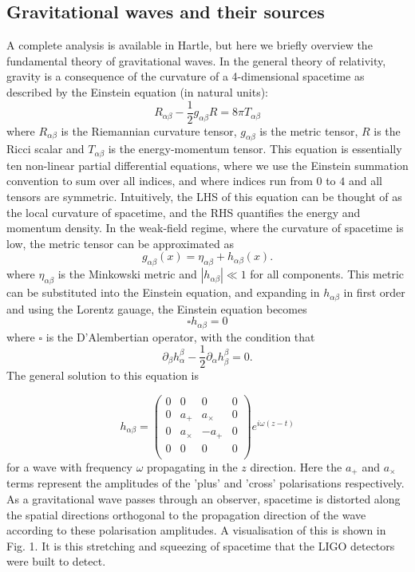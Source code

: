 \documentclass[11pt]{article}
\begin{document}
\subsection{Gravitational waves and their sources}
A complete analysis is available in Hartle\cite{hartle}, but here we briefly overview the fundamental theory of gravitational waves. In the general theory of relativity, gravity is a consequence of the curvature of a 4-dimensional spacetime as described by the Einstein equation (in natural units):
\begin{equation}
R_{\alpha\beta}-\frac{1}{2}g_{\alpha\beta}R=8\pi T_{\alpha\beta}
\end{equation}
where $R_{\alpha\beta}$ is the Riemannian curvature tensor, $g_{\alpha\beta}$ is the metric tensor, $R$ is the Ricci scalar and $T_{\alpha\beta}$ is the energy-momentum tensor. This equation is essentially ten non-linear partial differential equations, where we use the Einstein summation convention to sum over all indices, and where indices run from $0$ to $4$ and all tensors are symmetric. Intuitively, the LHS of this equation can be thought of as the local curvature of spacetime, and the RHS quantifies the energy and momentum density. In the weak-field regime, where the curvature of spacetime is low, the metric tensor can be approximated as
\begin{equation}
g_{\alpha\beta}(x)=\eta_{\alpha\beta}+h_{\alpha\beta}(x).
\end{equation}
where $\eta_{\alpha\beta}$ is the Minkowski metric and $|h_{\alpha\beta}| \ll 1$ for all components. This metric can be substituted into the Einstein equation, and expanding in $h_{\alpha\beta}$ in first order and using the Lorentz gauage, the Einstein equation becomes
\begin{equation}
\square h_{\alpha\beta}=0
\end{equation}
where $\square$ is the D'Alembertian operator, with the condition that
\begin{equation}
\partial_\beta h^\beta_\alpha-\frac{1}{2}\partial_\alpha h^\beta_\beta=0.
\end{equation}
The general solution to this equation is

\begin{equation}
h_{\alpha\beta}=
\begin{pmatrix}
0 & 0 & 0 & 0\\
0 & a_+ & a_\times & 0\\
0 & a_\times & -a_+ & 0\\
0 & 0 & 0 & 0\\
\end{pmatrix}
e^{i\omega(z-t)}
\end{equation}
for a wave with frequency $\omega$ propagating in the $z$ direction. Here the $a_+$ and $a_\times$ terms represent the amplitudes of the 'plus' and 'cross' polarisations respectively. As a gravitational wave passes through an observer, spacetime is distorted along the spatial directions orthogonal to the propagation direction of the wave according to these polarisation amplitudes. A visualisation of this is shown in Fig. 1. It is this stretching and squeezing of spacetime that the LIGO detectors were built to detect.
\end{document}
